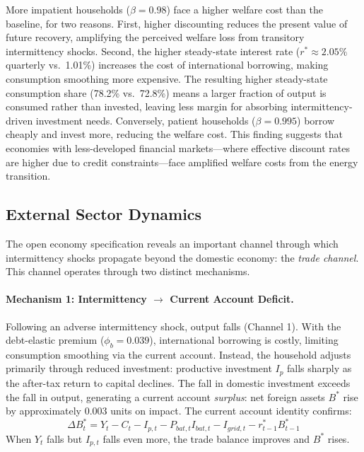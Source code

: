 \documentclass[12pt, a4paper]{article}
\begin{document}
More impatient households ($\beta = 0.98$) face a higher welfare cost than the baseline, for two reasons. First, higher discounting reduces the present value of future recovery, amplifying the perceived welfare loss from transitory intermittency shocks. Second, the higher steady-state interest rate ($r^* \approx 2.05\%$ quarterly vs.\ 1.01\%) increases the cost of international borrowing, making consumption smoothing more expensive. The resulting higher steady-state consumption share (78.2\% vs.\ 72.8\%) means a larger fraction of output is consumed rather than invested, leaving less margin for absorbing intermittency-driven investment needs. Conversely, patient households ($\beta = 0.995$) borrow cheaply and invest more, reducing the welfare cost. This finding suggests that economies with less-developed financial markets---where effective discount rates are higher due to credit constraints---face amplified welfare costs from the energy transition.

\subsection{External Sector Dynamics}

The open economy specification reveals an important channel through which intermittency shocks propagate beyond the domestic economy: the \textit{trade channel}. This channel operates through two distinct mechanisms.

\paragraph{Mechanism 1: Intermittency $\to$ Current Account Deficit.} Following an adverse intermittency shock, output falls (Channel 1). With the debt-elastic premium ($\phi_b = 0.039$), international borrowing is costly, limiting consumption smoothing via the current account. Instead, the household adjusts primarily through reduced investment: productive investment $I_p$ falls sharply as the after-tax return to capital declines. The fall in domestic investment exceeds the fall in output, generating a current account \textit{surplus}: net foreign assets $B^*$ rise by approximately 0.003 units on impact. The current account identity confirms:
\begin{equation*}
\Delta B^*_t = Y_t - C_t - I_{p,t} - P_{bat,t} I_{bat,t} - I_{grid,t} - r^*_{t-1} B^*_{t-1}
\end{equation*}
When $Y_t$ falls but $I_{p,t}$ falls even more, the trade balance improves and $B^*$ rises.
\end{document}
